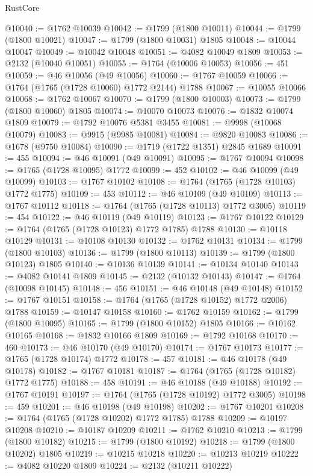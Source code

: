 \begin{lexlean}{RustCore}
\begin{coremodule}
@10040 := @1762 @10039
@10042 := @1799 (@1800 @10011)
@10044 := @1799 (@1800 @10021)
@10047 := @1799 (@1800 @10031) @1805
@10048 := @10044 @10047
@10049 := @10042 @10048
@10051 := @4082 @10049 @1809
@10053 := @2132 (@10040 @10051)
@10055 := @1764 (@10006 @10053)
@10056 := 451
@10059 := @46 @10056 (@49 @10056)
@10060 := @1767 @10059
@10066 := @1764 (@1765 (@1728 @10060) @1772 @2144) @1788
@10067 := @10055 @10066
@10068 := @1762 @10067
@10070 := @1799 (@1800 @10003)
@10073 := @1799 (@1800 @10060) @1805
@10074 := @10070 @10073
@10076 := @1832 @10074 @1809
@10079 := @1792 @10076 @5381 @3455
@10081 := @9998 (@10068 @10079)
@10083 := @9915 (@9985 @10081)
@10084 := @9820 @10083
@10086 := @1678 (@9750 @10084)
@10090 := @1719 (@1722 @1351) @2845 @1689
@10091 := 455
@10094 := @46 @10091 (@49 @10091)
@10095 := @1767 @10094
@10098 := @1765 (@1728 @10095) @1772
@10099 := 452
@10102 := @46 @10099 (@49 @10099)
@10103 := @1767 @10102
@10108 := @1764 (@1765 (@1728 @10103) @1772 @1775)
@10109 := 453
@10112 := @46 @10109 (@49 @10109)
@10113 := @1767 @10112
@10118 := @1764 (@1765 (@1728 @10113) @1772 @3005)
@10119 := 454
@10122 := @46 @10119 (@49 @10119)
@10123 := @1767 @10122
@10129 := @1764 (@1765 (@1728 @10123) @1772 @1785) @1788
@10130 := @10118 @10129
@10131 := @10108 @10130
@10132 := @1762 @10131
@10134 := @1799 (@1800 @10103)
@10136 := @1799 (@1800 @10113)
@10139 := @1799 (@1800 @10123) @1805
@10140 := @10136 @10139
@10141 := @10134 @10140
@10143 := @4082 @10141 @1809
@10145 := @2132 (@10132 @10143)
@10147 := @1764 (@10098 @10145)
@10148 := 456
@10151 := @46 @10148 (@49 @10148)
@10152 := @1767 @10151
@10158 := @1764 (@1765 (@1728 @10152) @1772 @2006) @1788
@10159 := @10147 @10158
@10160 := @1762 @10159
@10162 := @1799 (@1800 @10095)
@10165 := @1799 (@1800 @10152) @1805
@10166 := @10162 @10165
@10168 := @1832 @10166 @1809
@10169 := @1792 @10168
@10170 := 460
@10173 := @46 @10170 (@49 @10170)
@10174 := @1767 @10173
@10177 := @1765 (@1728 @10174) @1772
@10178 := 457
@10181 := @46 @10178 (@49 @10178)
@10182 := @1767 @10181
@10187 := @1764 (@1765 (@1728 @10182) @1772 @1775)
@10188 := 458
@10191 := @46 @10188 (@49 @10188)
@10192 := @1767 @10191
@10197 := @1764 (@1765 (@1728 @10192) @1772 @3005)
@10198 := 459
@10201 := @46 @10198 (@49 @10198)
@10202 := @1767 @10201
@10208 := @1764 (@1765 (@1728 @10202) @1772 @1785) @1788
@10209 := @10197 @10208
@10210 := @10187 @10209
@10211 := @1762 @10210
@10213 := @1799 (@1800 @10182)
@10215 := @1799 (@1800 @10192)
@10218 := @1799 (@1800 @10202) @1805
@10219 := @10215 @10218
@10220 := @10213 @10219
@10222 := @4082 @10220 @1809
@10224 := @2132 (@10211 @10222)

\end{coremodule}
\end{lexlean}
